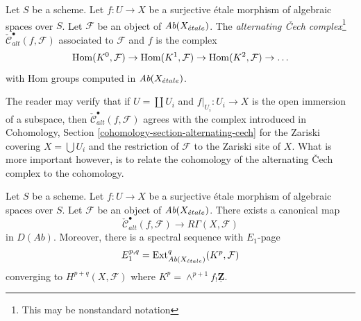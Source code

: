\begin{definition}
\label{definition-alternating-cech-complex}
Let $S$ be a scheme. Let $f : U \to X$ be a surjective \'etale morphism
of algebraic spaces over $S$. Let $\mathcal{F}$ be an object of
$\textit{Ab}(X_{\acute{e}tale})$. The
{\it alternating {\v C}ech complex}\footnote{This may be nonstandard notation}
$\check{\mathcal{C}}^\bullet_{alt}(f, \mathcal{F})$
associated to $\mathcal{F}$ and $f$ is the complex
$$
\mathop{\mathrm{Hom}}\nolimits(K^0, \mathcal{F}) \to \mathop{\mathrm{Hom}}\nolimits(K^1, \mathcal{F}) \to
\mathop{\mathrm{Hom}}\nolimits(K^2, \mathcal{F}) \to \ldots
$$
with Hom groups computed in $\textit{Ab}(X_{\acute{e}tale})$.
\end{definition}

\noindent
The reader may verify that if $U = \coprod U_i$ and $f|_{U_i} : U_i \to X$
is the open immersion of a subspace, then
$\check{\mathcal{C}}_{alt}^\bullet(f, \mathcal{F})$ agrees with the complex
introduced in
Cohomology, Section \ref{cohomology-section-alternating-cech}
for the Zariski covering $X = \bigcup U_i$ and the restriction
of $\mathcal{F}$ to the Zariski site of $X$. What is more important
however, is to relate the cohomology of the alternating
{\v C}ech complex to the cohomology.

\begin{lemma}
\label{lemma-alternating-cech-to-cohomology}
Let $S$ be a scheme. Let $f : U \to X$ be a surjective \'etale morphism
of algebraic spaces over $S$. Let $\mathcal{F}$ be an object of
$\textit{Ab}(X_{\acute{e}tale})$. There exists a canonical map
$$
\check{\mathcal{C}}^\bullet_{alt}(f, \mathcal{F})
\longrightarrow
R\Gamma(X, \mathcal{F})
$$
in $D(\textit{Ab})$. Moreover, there is a spectral sequence with $E_1$-page
$$
E_1^{p, q} =
\mathop{\mathrm{Ext}}\nolimits_{\textit{Ab}(X_{\acute{e}tale})}^q(K^p, \mathcal{F})
$$
converging to $H^{p + q}(X, \mathcal{F})$ where
$K^p = \wedge^{p + 1}f_!\underline{\mathbf{Z}}$.
\end{lemma}

